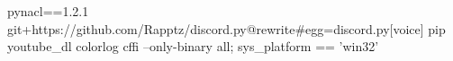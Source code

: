 pynacl==1.2.1
git+https://github.com/Rapptz/discord.py@rewrite#egg=discord.py[voice]
pip
youtube_dl
colorlog
cffi --only-binary all; sys_platform == 'win32'





